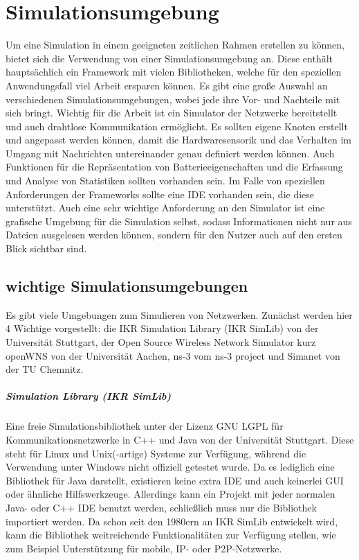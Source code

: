 \chapter{Simulationsumgebung}

Um eine Simulation in einem geeigneten zeitlichen Rahmen erstellen zu können, bietet sich die Verwendung von einer Simulationsumgebung an. Diese enthält hauptsächlich ein Framework mit vielen Bibliotheken, welche für den speziellen Anwendungsfall viel Arbeit ersparen können. \newline
Es gibt eine große Auswahl an verschiedenen Simulationsumgebungen, wobei jede ihre Vor- und Nachteile mit sich bringt. Wichtig für die Arbeit ist ein Simulator der Netzwerke bereitstellt und auch drahtlose Kommunikation ermöglicht. Es sollten eigene Knoten erstellt und angepasst werden können, damit die Hardwaresensorik und das Verhalten im Umgang mit Nachrichten untereinander genau definiert werden können. Auch Funktionen für die Repräsentation von Batterieeigenschaften und die Erfassung und Analyse von Statistiken sollten vorhanden sein.\newline
Im Falle von speziellen Anforderungen der Frameworks sollte eine IDE vorhanden sein, die diese unterstützt. Auch eine sehr wichtige Anforderung an den Simulator ist eine grafische Umgebung für die Simulation selbst, sodass Informationen nicht nur aus Dateien ausgelesen werden können, sondern für den Nutzer auch auf den ersten Blick sichtbar sind.

\section{wichtige Simulationsumgebungen}

Es gibt viele Umgebungen zum Simulieren von Netzwerken. Zunächst werden hier 4 Wichtige vorgestellt: die IKR Simulation Library (IKR SimLib) von der Universität Stuttgart, der Open Source Wireless Network Simulator kurz openWNS von der Universität Aachen, ns-3 vom ns-3 project und Simanet von der TU Chemnitz.

\paragraph{Simulation Library (IKR SimLib)\cite{ikr}}

Eine freie Simulationsbibliothek unter der Lizenz GNU LGPL für Kommunikationsnetzwerke in C++ und Java von der Universität Stuttgart. Diese steht für Linux und Unix(-artige) Systeme zur Verfügung, während die Verwendung unter Windows nicht offiziell getestet wurde.\newline
Da es lediglich eine Bibliothek für Java darstellt, existieren keine extra IDE und auch keinerlei GUI oder ähnliche Hilfswerkzeuge. Allerdings kann ein Projekt mit jeder normalen Java- oder C++ IDE benutzt werden, schließlich muss nur die Bibliothek importiert werden.\newline
Da schon seit den 1980ern an IKR SimLib entwickelt wird, kann die Bibliothek weitreichende Funktionalitäten zur Verfügung stellen, wie zum Beispiel Unterstützung für mobile, IP- oder P2P-Netzwerke.

